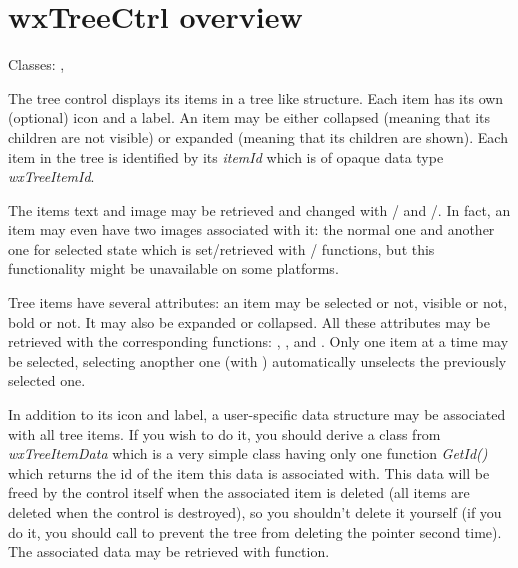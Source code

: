 \section{wxTreeCtrl overview}\label{wxtreectrloverview}

Classes: , 

The tree control displays its items in a tree like structure. Each item has its
own (optional) icon and a label. An item may be either collapsed (meaning that
its children are not visible) or expanded (meaning that its children are
shown). Each item in the tree is identified by its {\it itemId} which is of
opaque data type {\it wxTreeItemId}.

The items text and image may be retrieved and changed with 
/ 
and 
/.
In fact, an item may even have two images associated with it: the normal one
and another one for selected state which is set/retrieved with 
/ 
functions, but this functionality might be unavailable on some platforms.

Tree items have several attributes: an item may be selected or not, visible or
not, bold or not. It may also be expanded or collapsed. All these attributes
may be retrieved with the corresponding functions: 
, 
,  
and . Only one item at a time may be
selected, selecting anopther one (with 
) automatically unselects the
previously selected one.

In addition to its icon and label, a user-specific data structure may be associated
with all tree items. If you wish to do it, you should derive a class from {\it
wxTreeItemData} which is a very simple class having only one function {\it
GetId()} which returns the id of the item this data is associated with. This
data will be freed by the control itself when the associated item is deleted
(all items are deleted when the control is destroyed), so you shouldn't delete
it yourself (if you do it, you should call 
 to prevent the tree from
deleting the pointer second time). The associated data may be retrieved with 
 function.

